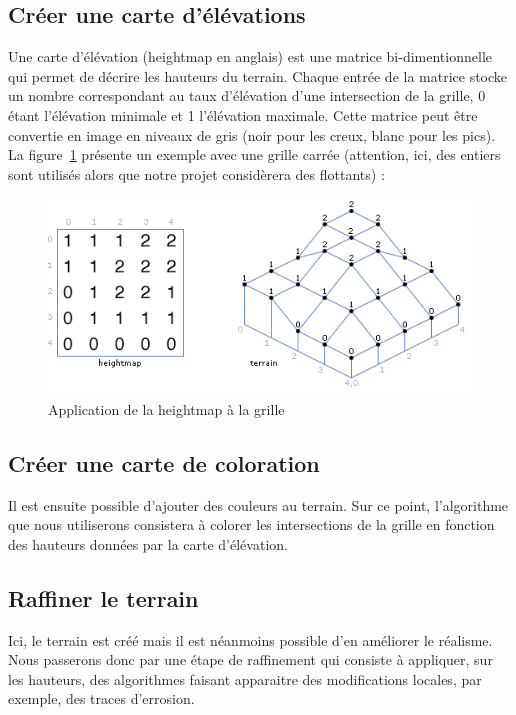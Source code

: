 \subsection{Créer une carte d'élévations}
Une carte d'élévation (heightmap en anglais) est une matrice bi-dimentionnelle qui permet de décrire les hauteurs du terrain. Chaque entrée de la matrice stocke un nombre correspondant au taux d'élévation d'une intersection de la grille, 0 étant l'élévation minimale et 1 l'élévation maximale.
Cette matrice peut \^etre convertie en image en niveaux de gris (noir pour les creux, blanc pour les pics).\\
La figure~\ref{fig:heightmap} présente un exemple avec une grille carrée (attention, ici, des entiers sont utilisés alors que notre projet considèrera des flottants) :
\begin{figure}[h]
  \centering
  \includegraphics[scale = 0.55]{resources/heightmap_carre.png}
  \caption{Application de la heightmap à la grille}
  \label{fig:heightmap}
\end{figure}

\subsection{Créer une carte de coloration}
Il est ensuite possible d'ajouter des couleurs au terrain. Sur ce point, l'algorithme que nous utiliserons consistera à colorer les intersections de la grille en fonction des hauteurs données par la carte d'élévation.

\subsection{Raffiner le terrain}
Ici, le terrain est créé mais il est néanmoins possible d'en améliorer le réalisme. Nous passerons donc par une étape de raffinement qui consiste à appliquer, sur les hauteurs, des algorithmes faisant apparaitre des modifications locales, par exemple, des traces d'errosion.

